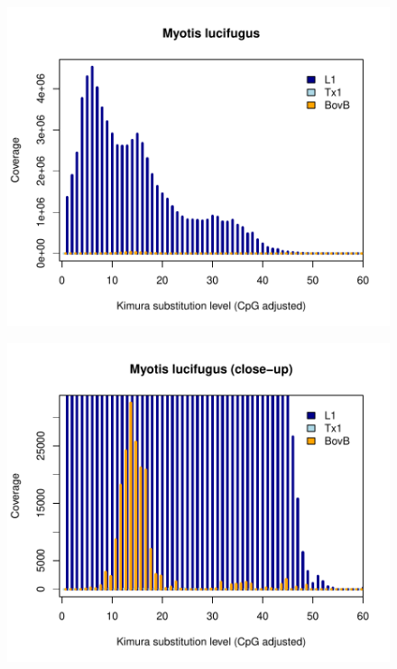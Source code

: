\documentclass[12pt,a4paper,times]{article}
\begin{document}
\begin{figure}[H]
	\centering
	\includegraphics[scale=0.8]{suppFigures/divergencePlots/Myotis_lucifugus.pdf}
	\caption{\label{Myotis_lucifugus}}
\end{figure}

\begin{figure}[H]
	\centering
	\includegraphics[scale=0.8]{suppFigures/divergencePlots/Myotis_lucifugus_closeup.pdf}
	\caption{\label{Myotis_lucifugus_closeup}}
\end{figure}
\end{document}
